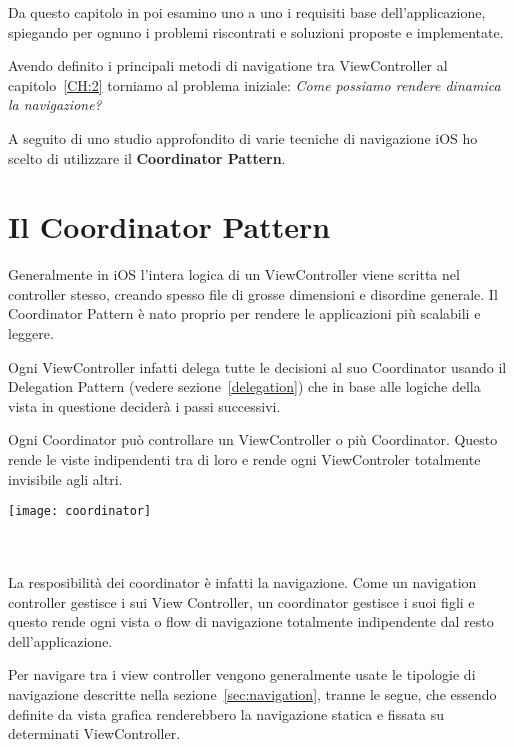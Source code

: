

Da questo capitolo in poi esamino uno a uno i requisiti base dell'applicazione, spiegando per ognuno
i problemi riscontrati e soluzioni proposte e implementate.

Avendo definito i principali metodi di navigatione tra ViewController al capitolo~\ref{CH:2} torniamo al problema iniziale:
\textit{Come possiamo rendere dinamica la navigazione?}

A seguito di uno studio approfondito di varie tecniche di navigazione iOS ho scelto di utilizzare il
\textbf{Coordinator Pattern}\cite{coordinatorpattern}.

\section{Il Coordinator Pattern}

Generalmente in iOS l'intera logica di un ViewController viene scritta nel controller stesso, creando spesso
file di grosse dimensioni e disordine generale. Il Coordinator Pattern è nato proprio per rendere 
le applicazioni più scalabili e leggere. 

Ogni ViewController infatti delega tutte le decisioni al suo Coordinator usando il Delegation Pattern (vedere sezione~\ref{delegation}) che in base alle logiche
della vista in questione deciderà i passi successivi.

Ogni Coordinator può controllare un ViewController o più Coordinator. Questo rende le viste
indipendenti tra di loro e rende ogni ViewControler totalmente invisibile agli altri.\\

\begin{minipage}{\linewidth}
    \centering
    \texttt{[image: coordinator]}
    \label{fig:4}
\end{minipage}\\ \\

La resposibilità dei coordinator è infatti la navigazione. Come un navigation controller gestisce i sui View Controller, un coordinator gestisce
i suoi figli e questo rende ogni vista o flow di navigazione totalmente indipendente dal resto dell'applicazione.

Per navigare tra i view controller vengono generalmente usate le tipologie di navigazione
descritte nella sezione~\ref{sec:navigation}, tranne le segue, che essendo definite da vista grafica renderebbero
la navigazione statica e fissata su determinati ViewController. \\

